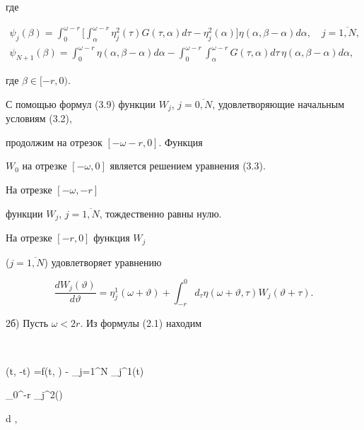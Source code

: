 где


\begin{gather*}


\psi_{j}(\beta) = \int_{0}^{\omega-r}\bigg[\int_{\alpha}^{\omega-r}


\eta_{j}^{2}(\tau) G(\tau, \alpha) d \tau- \eta_{j}^{2}(\alpha)\bigg]


\eta(\alpha, \beta- \alpha) d \alpha, \quad j= \overline{1,N}, \\


%


\psi_{N+1}(\beta) = \int_{0}^{\omega-r} \eta(\alpha, \beta- \alpha)


d \alpha- \int_{0}^{\omega-r} \int_{\alpha}^{\omega-r} G(\tau, \alpha)


d \tau\, \eta(\alpha, \beta- \alpha) d \alpha,


\end{gather*}


где $\beta \in[-r,0)$.


С помощью формул (3.9) функции $W_{j}$, $j=


\overline{0,N}$, удовлетворяющие начальным условиям (3.2),


продолжим на отрезок $[- \omega-r,0]$. Функция


$W_{0}$ на отрезке $[-\omega,0]$ является решением уравнения (3.3).


На отрезке $[-\omega,-r]$


функции $W_{j}$, $j=\overline{1,N}$, тождественно равны нулю.


На отрезке $[-r,0]$ функция $W_{j}$


($j=\overline{1,N}$) удовлетворяет уравнению


$$


\frac{dW_{j}(\vartheta)}{d \vartheta} = \eta_{j}^{1}(\omega+ \vartheta) +


\int_{-r}^{0}d_{\tau} \eta(\omega+ \vartheta, \tau) W_{j}(\vartheta+ \tau).


$$





2б) Пусть $\omega < 2r$. Из формулы (2.1) находим


$$


\eta(t, \beta-t) =f(t, \beta) - \sum_{j=1}^{N} \eta_{j}^{1}(t)


\int_{0}^{\omega-r} \eta_{j}^{2}(\tau)


 d \tau,


